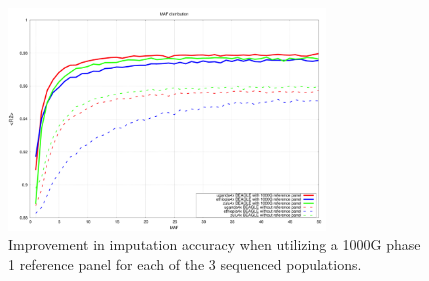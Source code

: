 \begin{figure}
\centering
\includegraphics[width=0.75\textwidth]{fig/SN09f3}
\caption{Improvement in imputation accuracy when utilizing a 1000G phase 1 reference panel for each of the 3 sequenced populations.}
\label{fig:SN09f3}
\end{figure}